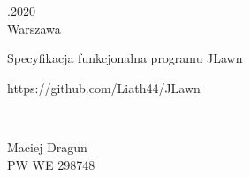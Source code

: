 \documentclass[12pt]{article}
\renewcommand{\_}{\kern-1.5pt\textunderscore\kern-1.5pt}
\begin{document}
\begin{FlushRight}
{\fontsize{14pt}{16.8pt}.2020\\
Warszawa\par}
\end{FlushRight}\par


\vspace{\baselineskip}

\vspace{\baselineskip}

\vspace{\baselineskip}

\vspace{\baselineskip}

\vspace{\baselineskip}

\vspace{\baselineskip}

\vspace{\baselineskip}

\vspace{\baselineskip}

\vspace{\baselineskip}

\vspace{\baselineskip}

\vspace{\baselineskip}

\vspace{\baselineskip}

\vspace{\baselineskip}

\vspace{\baselineskip}
\begin{Center}
{\fontsize{26pt}{31.2pt}\selectfont Specyfikacja funkcjonalna programu JLawn\par}
\end{Center}\par


\vspace{\baselineskip}
\begin{Center}
{\fontsize{14pt}{16.8pt}\selectfont https://github.com/Liath44/JLawn\par}\\
{\fontsize{14pt}{16.8pt}\selectfont Maciej Dragun\\
PW WE 298748\\
\par}
\end{Center}\par
\end{document}

